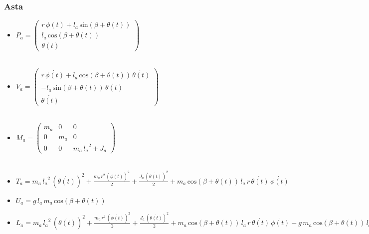 \subsubsection{Asta}
\begin{itemize}
	
	\item \textbf{$P_a = \left(\begin{array}{c}
		r\,\phi \left(t\right)+l_a \,\mathrm{sin}\left(\beta +\theta \left(t\right)\right)\\
		l_a \,\mathrm{cos}\left(\beta +\theta \left(t\right)\right)\\
		\theta \left(t\right)
		\end{array}\right)$}
	\\\\
	\item \textbf{$V_a = \left(\begin{array}{c}
		r\,\dot{\phi \left(t\right)}+l_a \,\mathrm{cos}\left(\beta +\theta \left(t\right)\right)\,\dot{\theta \left(t\right)}\\
		-l_a \,\mathrm{sin}\left(\beta +\theta \left(t\right)\right)\,\dot{\theta \left(t\right)}\\
		\dot{\theta \left(t\right)}
		\end{array}\right)$}
	\\\\
	\item \textbf{$M_a = \left(\begin{array}{ccc}
		m_a  & 0 & 0\\
		0 & m_a  & 0\\
		0 & 0 & m_a \,{l_a }^2 +J_a 
		\end{array}\right)$}
	\\\\
	\item \textbf{$T_a = m_a \,{l_a }^2 \,{{\left(\dot{\theta \left(t\right)}\right)}}^2 +\frac{m_a \,r^2 \,{{\left(\dot{\phi \left(t\right)}\right)}}^2 }{2}+\frac{J_a \,{{\left(\dot{\theta \left(t\right)}\right)}}^2 }{2}+m_a \,\mathrm{cos}\left(\beta +\theta \left(t\right)\right)\,l_a \,r\,\dot{\theta \left(t\right)}\,\dot{\phi \left(t\right)}$}
	\\
	\item \textbf{$U_a = g\,l_a \,m_a \,\mathrm{cos}\left(\beta +\theta \left(t\right)\right)$}
	\\
	\item \textbf{$L_a = m_a \,{l_a }^2 \,{{\left(\dot{\theta \left(t\right)}\right)}}^2 +\frac{m_a \,r^2 \,{{\left(\dot{\phi \left(t\right)}\right)}}^2 }{2}+\frac{J_a \,{{\left(\dot{\theta \left(t\right)}\right)}}^2 }{2}+m_a \,\mathrm{cos}\left(\beta +\theta \left(t\right)\right)\,l_a \,r\,\dot{\theta \left(t\right)}\,\dot{\phi \left(t\right)}-g\,m_a \,\mathrm{cos}\left(\beta +\theta \left(t\right)\right)\,l_a$}
\end{itemize}
\newpage
